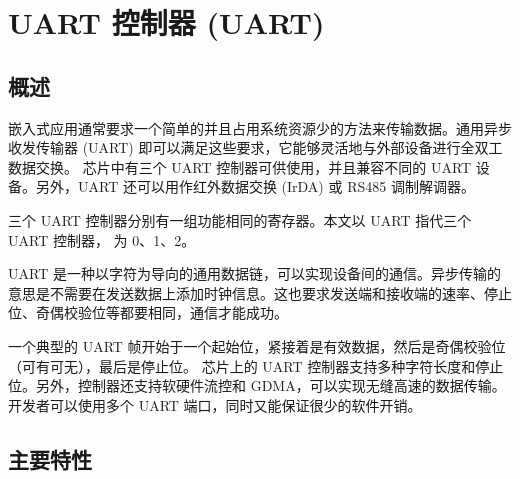 \documentclass[main\_\_CN.tex]{subfiles}
\begin{document}

\ifglobal
\else
    {\let\clearpage\relax \listoftodos}
    \tableofcontents
\fi



\hypertarget{uart}{}
\chapter{UART 控制器 (UART)}
\label{mod:uart}

\section{概述}

嵌入式应用通常要求一个简单的并且占用系统资源少的方法来传输数据。通用异步收发传输器 (UART) 即可以满足这些要求，它能够灵活地与外部设备进行全双工数据交换。\chipname{} 芯片中有三个 UART 控制器可供使用，并且兼容不同的 UART 设备。另外，UART 还可以用作红外数据交换 (IrDA) 或 RS485 调制解调器。

三个  UART 控制器分别有一组功能相同的寄存器。本文以 UART 指代三个 UART 控制器， 为 0、1、2。

UART 是一种以字符为导向的通用数据链，可以实现设备间的通信。异步传输的意思是不需要在发送数据上添加时钟信息。这也要求发送端和接收端的速率、停止位、奇偶校验位等都要相同，通信才能成功。

一个典型的 UART 帧开始于一个起始位，紧接着是有效数据，然后是奇偶校验位（可有可无），最后是停止位。\chipname{} 芯片上的 UART 控制器支持多种字符长度和停止位。另外，控制器还支持软硬件流控和 GDMA，可以实现无缝高速的数据传输。开发者可以使用多个 UART 端口，同时又能保证很少的软件开销。

\section{主要特性}
\end{document}
